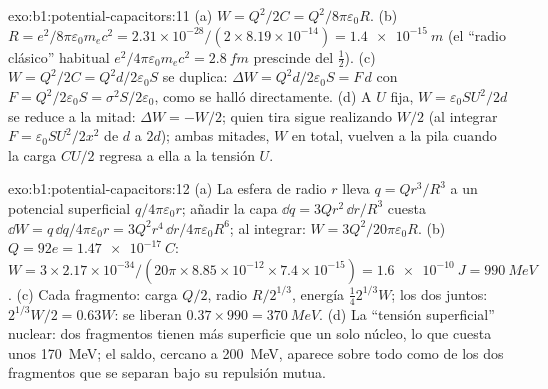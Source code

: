 \begin{solution}{exo:b1:potential-capacitors:11}
(a) $W = Q^2/2C = Q^2/8\pi\varepsilon_0R$. (b) $R = e^2/8\pi\varepsilon_0m_ec^2 = 2.31 \times
10^{-28}/(2 \times 8.19 \times 10^{-14}) = \qty{1.4e-15}{m}$ (el ``radio clásico''
habitual $e^2/4\pi\varepsilon_0m_ec^2 = \qty{2.8}{fm}$ prescinde del $\tfrac12$). (c) $W =
Q^2/2C = Q^2d/2\varepsilon_0S$ se duplica: $\Delta W = Q^2d/2\varepsilon_0S = F\,d$ con $F =
Q^2/2\varepsilon_0S = \sigma^2S/2\varepsilon_0$, como se halló directamente. (d) A $U$ fija, $W =
\varepsilon_0SU^2/2d$ se reduce a la mitad: $\Delta W = -W/2$; quien tira sigue
realizando $W/2$ (al integrar $F = \varepsilon_0SU^2/2x^2$ de $d$ a $2d$); ambas
mitades, $W$ en total, vuelven a la pila cuando la carga $CU/2$ regresa a
ella a la tensión $U$.
\end{solution}

\begin{solution}{exo:b1:potential-capacitors:12}
(a) La esfera de radio $r$ lleva $q = Qr^3/R^3$ a un potencial superficial
$q/4\pi\varepsilon_0r$; añadir la capa $\dd q = 3Qr^2\,\dd r/R^3$ cuesta $\dd W =
q\,\dd q/4\pi\varepsilon_0r = 3Q^2r^4\,\dd r/4\pi\varepsilon_0R^6$; al integrar: $W =
3Q^2/20\pi\varepsilon_0R$. (b) $Q = 92e = \qty{1.47e-17}{C}$: $W = 3 \times 2.17 \times
10^{-34}/(20\pi \times 8.85 \times 10^{-12} \times 7.4 \times 10^{-15}) = \qty{1.6e-10}{J}
= \qty{990}{MeV}$. (c) Cada fragmento: carga $Q/2$, radio $R/2^{1/3}$,
energía $\tfrac14 2^{1/3}W$; los dos juntos: $2^{1/3}W/2 = 0.63W$: se liberan
$0.37 \times 990 = \qty{370}{MeV}$. (d) La ``tensión superficial'' nuclear:
dos fragmentos tienen más superficie que un solo núcleo, lo que cuesta unos
\qty{170}{MeV}; el saldo, cercano a \qty{200}{MeV}, aparece sobre todo como
 de los dos fragmentos que se separan bajo su repulsión mutua.
\end{solution}

